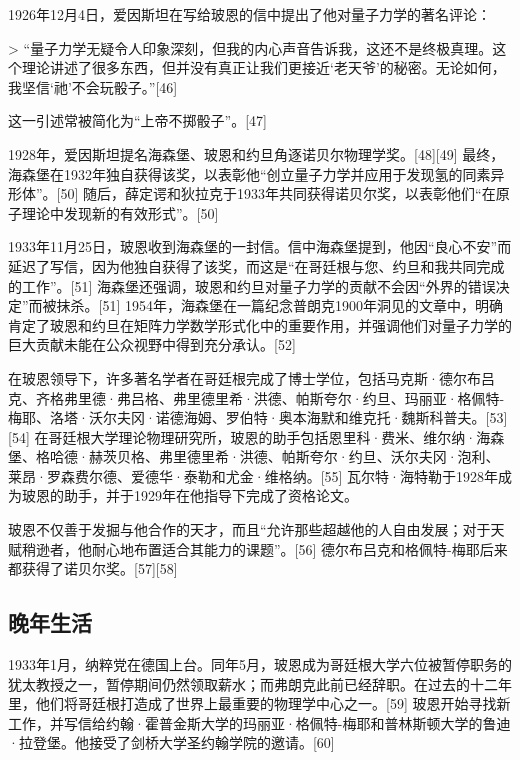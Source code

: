 1926年12月4日，爱因斯坦在写给玻恩的信中提出了他对量子力学的著名评论：

> “量子力学无疑令人印象深刻，但我的内心声音告诉我，这还不是终极真理。这个理论讲述了很多东西，但并没有真正让我们更接近‘老天爷’的秘密。无论如何，我坚信‘祂’不会玩骰子。”[46]

这一引述常被简化为“上帝不掷骰子”。[47]

1928年，爱因斯坦提名海森堡、玻恩和约旦角逐诺贝尔物理学奖。[48][49] 最终，海森堡在1932年独自获得该奖，以表彰他“创立量子力学并应用于发现氢的同素异形体”。[50] 随后，薛定谔和狄拉克于1933年共同获得诺贝尔奖，以表彰他们“在原子理论中发现新的有效形式”。[50]

1933年11月25日，玻恩收到海森堡的一封信。信中海森堡提到，他因“良心不安”而延迟了写信，因为他独自获得了该奖，而这是“在哥廷根与您、约旦和我共同完成的工作”。[51] 海森堡还强调，玻恩和约旦对量子力学的贡献不会因“外界的错误决定”而被抹杀。[51] 1954年，海森堡在一篇纪念普朗克1900年洞见的文章中，明确肯定了玻恩和约旦在矩阵力学数学形式化中的重要作用，并强调他们对量子力学的巨大贡献未能在公众视野中得到充分承认。[52]

在玻恩领导下，许多著名学者在哥廷根完成了博士学位，包括马克斯·德尔布吕克、齐格弗里德·弗吕格、弗里德里希·洪德、帕斯夸尔·约旦、玛丽亚·格佩特-梅耶、洛塔·沃尔夫冈·诺德海姆、罗伯特·奥本海默和维克托·魏斯科普夫。[53][54] 在哥廷根大学理论物理研究所，玻恩的助手包括恩里科·费米、维尔纳·海森堡、格哈德·赫茨贝格、弗里德里希·洪德、帕斯夸尔·约旦、沃尔夫冈·泡利、莱昂·罗森费尔德、爱德华·泰勒和尤金·维格纳。[55] 瓦尔特·海特勒于1928年成为玻恩的助手，并于1929年在他指导下完成了资格论文。

玻恩不仅善于发掘与他合作的天才，而且“允许那些超越他的人自由发展；对于天赋稍逊者，他耐心地布置适合其能力的课题”。[56] 德尔布吕克和格佩特-梅耶后来都获得了诺贝尔奖。[57][58]
\subsection{晚年生活}
1933年1月，纳粹党在德国上台。同年5月，玻恩成为哥廷根大学六位被暂停职务的犹太教授之一，暂停期间仍然领取薪水；而弗朗克此前已经辞职。在过去的十二年里，他们将哥廷根打造成了世界上最重要的物理学中心之一。[59] 玻恩开始寻找新工作，并写信给约翰·霍普金斯大学的玛丽亚·格佩特-梅耶和普林斯顿大学的鲁迪·拉登堡。他接受了剑桥大学圣约翰学院的邀请。[60] 

